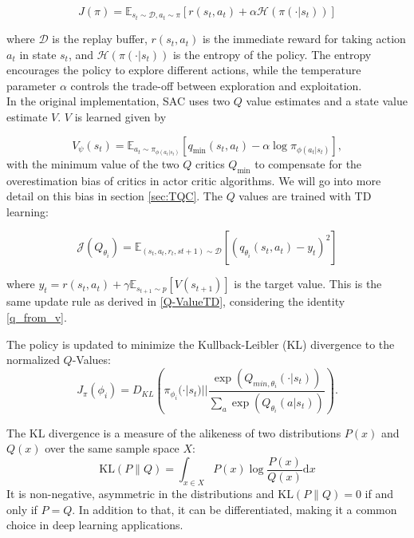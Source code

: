 \begin{equation}
J(\pi) = \mathbb{E}_{s_t \sim \mathcal{D}, a_t \sim \pi}[r(s_t, a_t) + \alpha \mathcal{H}(\pi(\cdot|s_t))]
\end{equation}

where $\mathcal{D}$ is the replay buffer, $r(s_t, a_t)$ is the immediate reward for taking action $a_t$ in state $s_t$, and $\mathcal{H}(\pi(\cdot|s_t))$ is the entropy of the policy. The entropy 
encourages the policy to explore different actions, while the temperature parameter $\alpha$ controls the trade-off between exploration and exploitation.\\

In the original implementation, SAC uses two $Q$ value estimates and a state value estimate $V$. $V$ is learned given by 

\begin{equation}
    V_{\psi}(s_t) = \mathbb{E}_{a_t \sim \pi_{\phi(a_t|s_t)}}[q_\text{min}(s_t, a_t) - \alpha \log \pi_{\phi(a_t|s_t)}],
\end{equation}
with the minimum value of the two $Q$ critics $Q_\text{min}$ to compensate for the overestimation bias of critics in actor critic 
algorithms. We will 
go into more detail on this bias in section \ref{sec:TQC}.
The $Q$ values are trained with TD learning:

\begin{equation}
    \mathcal{J}(Q_{\theta_i}) = \mathbb{E}_{(s_t, a_t, r_t, s{t+1}) \sim \mathcal{D}}[(q_{\theta_i}(s_t,a_t) - y_t)^2]
\end{equation}

where $y_t = r(s_t, a_t) + \gamma \mathbb{E}_{s_{t+1} \sim p}[V(s_{t+1})]$ is the target value. This is the same update rule as derived in \ref{Q-ValueTD}, 
considering the identity \ref{q_from_v}.

The policy is updated to minimize the Kullback-Leibler (KL) divergence to the normalized $Q$-Values:
\begin{equation}
    \label{sac_pol_obj}
    J_\pi(\phi_{i}) = D_{KL} \left( \pi_{\phi_{i}}(\cdot|s_t) || \frac{\exp(Q_{min, {\theta_i}}(\cdot|s_t))}{\underset{a}{\sum}  \exp(Q_{\theta_i}(a|s_t))} \right).
\end{equation}

The KL divergence is a measure of the alikeness of two distributions $P(x)$ and $Q(x)$ over the same sample space $X$:
\begin{equation}
    \label{KL}
    \mathrm{KL}(P\|Q) = \int_{x\in X} P(x) \log \frac{P(x)}{Q(x)} \mathrm{d}x
\end{equation}
It is non-negative, asymmetric in the distributions and $\mathrm{KL}(P\|Q) = 0$ if and only if $P = Q$. In addition to that, it can be differentiated, making it 
a common choice in deep learning applications.\\

